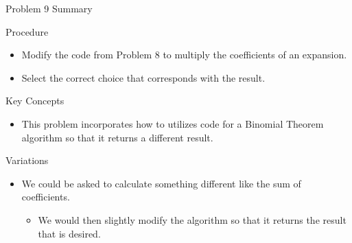 \begin{summary}{Problem 9 Summary}
    \begin{statement}{Procedure}
        \begin{itemize}
            \item Modify the code from Problem 8 to multiply the coefficients of an expansion.
            \item Select the correct choice that corresponds with the result.
        \end{itemize}
    \end{statement}
    \begin{statement}{Key Concepts}
        \begin{itemize}
            \item This problem incorporates how to utilizes code for a Binomial Theorem algorithm so that it returns a different result.
        \end{itemize}
    \end{statement}
    \begin{statement}{Variations}
        \begin{itemize}
            \item We could be asked to calculate something different like the sum of coefficients.
            \begin{itemize}
                \item We would then slightly modify the algorithm so that it returns the result that is desired.
            \end{itemize}
        \end{itemize}
    \end{statement}
\end{summary}

